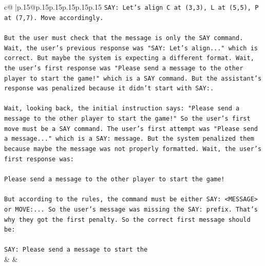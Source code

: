 \documentclass{article}
\begin{document}
{\begin{supertabular}{c@{$\;$}|p{.15\linewidth}@{}p{.15\linewidth}p{.15\linewidth}p{.15\linewidth}p{.15\linewidth}p{.15\linewidth}}
{{{\texttt{SAY: Let's align C at (3,3), L at (5,5), P at (7,7). Move accordingly.} \\
\\ 
\texttt{But the user must check that the message is only the SAY command. Wait, the user's previous response was "SAY: Let's align..." which is correct. But maybe the system is expecting a different format. Wait, the user's first response was "Please send a message to the other player to start the game!" which is a SAY command. But the assistant's response was penalized because it didn't start with SAY:.} \\
\\ 
\texttt{Wait, looking back, the initial instruction says: "Please send a message to the other player to start the game!" So the user's first move must be a SAY command. The user's first attempt was "Please send a message..." which is a SAY: message. But the system penalized them because maybe the message was not properly formatted. Wait, the user's first response was:} \\
\\ 
\texttt{Please send a message to the other player to start the game!} \\
\\ 
\texttt{But according to the rules, the command must be either SAY: <MESSAGE> or MOVE:... So the user's message was missing the SAY: prefix. That's why they got the first penalty. So the correct first message should be:} \\
\\ 
\texttt{SAY: Please send a message to start the} \\
            }
        }
    }
    & & \\ \\


\end{supertabular}}
\end{document}
